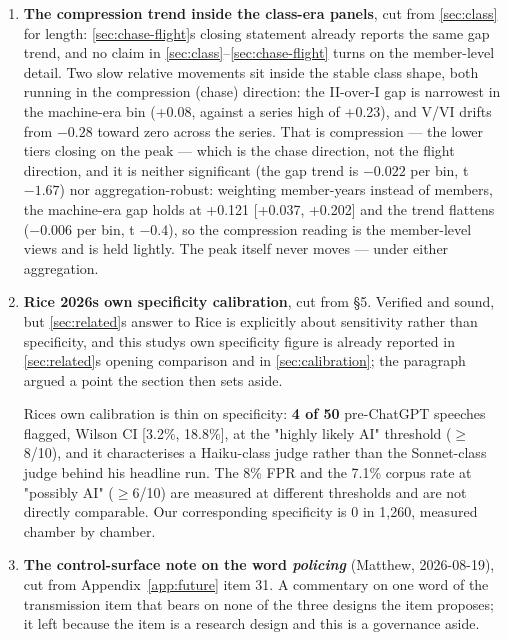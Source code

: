 \begin{enumerate}
\def\labelenumi{\arabic{enumi}.}
\setcounter{enumi}{10}
\item
  \textbf{The compression trend inside the class-era panels}, cut from \cref{sec:class} for
  length: \cref{sec:chase-flight}\textquotesingle s closing statement already reports the same gap trend, and
  no claim in \cref{sec:class}--\cref{sec:chase-flight} turns on the member-level detail. Two slow
  relative movements sit inside the stable class shape, both running in the
  compression (chase) direction: the II-over-I gap is narrowest in the
  machine-era bin (+0.08, against a series high of +0.23), and V/VI drifts
  from \(-0.28\) toward zero across the series. That is compression --- the lower
  tiers closing on the peak --- which is the chase direction, not the flight
  direction, and it is neither significant (the gap trend is \(-0.022\) per bin,
  t \(-1.67\)) nor aggregation-robust: weighting member-years instead of
  members, the machine-era gap holds at +0.121 {[}+0.037, +0.202{]} and the
  trend flattens (\(-0.006\) per bin, t \(-0.4\)), so the compression reading is the
  member-level view\textquotesingle s and is held lightly. The peak itself never moves ---
  under either aggregation.
\item
  \textbf{Rice 2026\textquotesingle s own specificity calibration}, cut from §5. Verified and
  sound, but \cref{sec:related}\textquotesingle s answer to Rice is explicitly about sensitivity rather than
  specificity, and this study\textquotesingle s own specificity figure is already reported in
  \cref{sec:related}\textquotesingle s opening comparison and in \cref{sec:calibration}; the paragraph argued a point the
  section then sets aside.

  Rice\textquotesingle s own calibration is thin on specificity: \textbf{4 of 50} pre-ChatGPT
  speeches flagged, Wilson CI {[}3.2\%, 18.8\%{]}, at the "highly likely AI"
  threshold (\(\geq\)8/10), and it characterises a Haiku-class judge rather than
  the Sonnet-class judge behind his headline run. The 8\% FPR and the 7.1\%
  corpus rate at "possibly AI" (\(\geq\)6/10) are measured at different thresholds
  and are not directly comparable. Our corresponding specificity is 0 in
  1,260, measured chamber by chamber.
\item
  \textbf{The control-surface note on the word \emph{policing}} (Matthew,
  2026-08-19), cut from Appendix~\ref{app:future} item 31. A commentary on one word of the transmission item that bears on
  none of the three designs the item proposes; it left because the item is a
  research design and this is a governance aside.


\end{enumerate}
